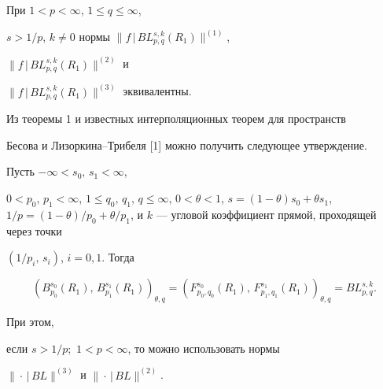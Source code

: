 \begin{thm}


При $1 < p < \infty$, $1 \le q \le \infty$,


$s >1/p$, $k \ne 0$ нормы $\|f\,|\,BL^{s,k}_{p,q}(R_1)\|^{(1)}$,


$\|f\,|\,BL^{s,k}_{p,q}(R_1)\|^{(2)}$ и


$\|f\,|\,BL^{s,k}_{p,q}(R_1)\|^{(3)}$ эквивалентны.


\end{thm}





Из теоремы 1 и известных интерполяционных теорем для пространств


Бесова и Лизоркина--Трибеля [1] можно получить следующее утверждение.





\begin{thm}


Пусть $-\infty <s_0,\,s_1<\infty$,


$0<p_0,\,p_1 <\infty$, $1\le q_0,\,q_1,\, q \le \infty$, $0<\theta


<1$, $s=(1-\theta )s_0+\theta s_1$, $1/p = (1-\theta )/p_0 + \theta


/p_1$, и $k$ --- угловой коэффициент прямой, проходящей через точки


$(1/p_i,\,s_i)$, $i=0,1$. Тогда


$$


(B^{s_0}_{p_0}(R_1),\,B^{s_1}_{p_1}(R_1))_{\theta, q} =


(F^{s_0}_{p_0, q_0}(R_1),\,F^{s_1}_{p_1, q_1}(R_1))_{\theta, q}


= BL^{s,k}_{p,q}.


$$


При этом,










если $s>1/p;$ $1<p<\infty$, то можно использовать нормы


$\|\cdot \,|\,BL\|^{(3)}$ и $\|\cdot \,|\,BL\|^{(2)}$.




\end{thm}





